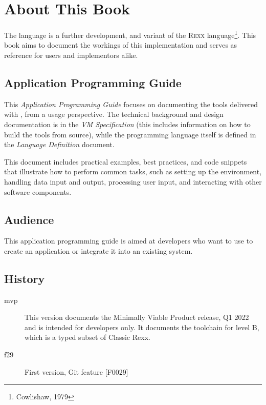\def\tightlist{}


\chapter*{About This Book}
The \crexx{} language is a further development, and variant of the
\textsc{Rexx} language\footnote{Cowlishaw, 1979}. This book aims to
document the workings of this implementation and serves as reference
for users and implementors alike.

\section*{Application Programming Guide}

This \emph{Application Programming Guide} focuses on documenting the
tools delivered with \crexx{}, from a usage perspective. The technical
background and design documentation is in the \emph{\crexx{} VM
  Specification} (this includes information on how to build the tools
from source), while the programming language itself is defined in
the \emph{\crexx{} Language Definition} document.

This document includes practical examples, best practices, and code
snippets that illustrate how to perform common tasks, such as setting
up the environment, handling data input and output, processing user
input, and interacting with other software components.

\section*{Audience}
This application programming guide is aimed at developers who want to use \crexx{} to create an application or integrate it into an existing system.

\section*{History}

\begin{description}
\item[mvp] This version documents the Minimally Viable Product
  release, Q1 2022 and is intended for developers only. It documents
  the toolchain for \crexx{} level B, which is a typed
  subset of Classic Rexx.
\item[f29] First version, Git feature [F0029]
\end{description}

